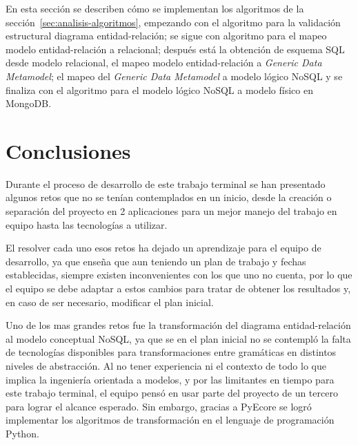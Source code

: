 En esta sección se describen cómo se implementan los algoritmos de la sección~\ref{sec:analisis-algoritmos}, empezando con el algoritmo para la validación estructural diagrama entidad-relación; se sigue con algoritmo para el mapeo modelo entidad-relación a relacional; después está la obtención de esquema SQL desde modelo relacional, el mapeo modelo entidad-relación a \textit{Generic Data Metamodel}; el mapeo del \textit{Generic Data Metamodel} a modelo lógico NoSQL y se finaliza con el algoritmo para el modelo lógico NoSQL a modelo físico en MongoDB.








\section{Conclusiones}
Durante el proceso de desarrollo de este trabajo terminal se han presentado algunos retos que no se tenían contemplados en un inicio, desde la creación o separación del proyecto en 2 aplicaciones para un mejor manejo del trabajo en equipo hasta las tecnologías a utilizar. 

El resolver cada uno esos retos ha dejado un aprendizaje para el equipo de desarrollo, ya que enseña que aun teniendo un plan de trabajo y fechas establecidas, siempre existen inconvenientes con los que uno no cuenta, por lo que el equipo se debe adaptar a estos cambios para tratar de obtener los resultados y, en caso de ser necesario, modificar el plan inicial.

Uno de los mas grandes retos fue la transformación del diagrama entidad-relación al modelo conceptual NoSQL, ya que se en el plan inicial no se contempló la falta de tecnologías disponibles para transformaciones entre gramáticas en distintos niveles de abstracción. Al no tener experiencia ni el contexto de todo lo que implica la ingeniería orientada a modelos, y por las limitantes en tiempo para este trabajo terminal, el equipo pensó en usar parte del proyecto de un tercero para lograr el alcance esperado. Sin embargo, gracias a PyEcore\cite{pyecore_pyecore_2020} se logró implementar los  algoritmos de transformación en el lenguaje de programación Python.